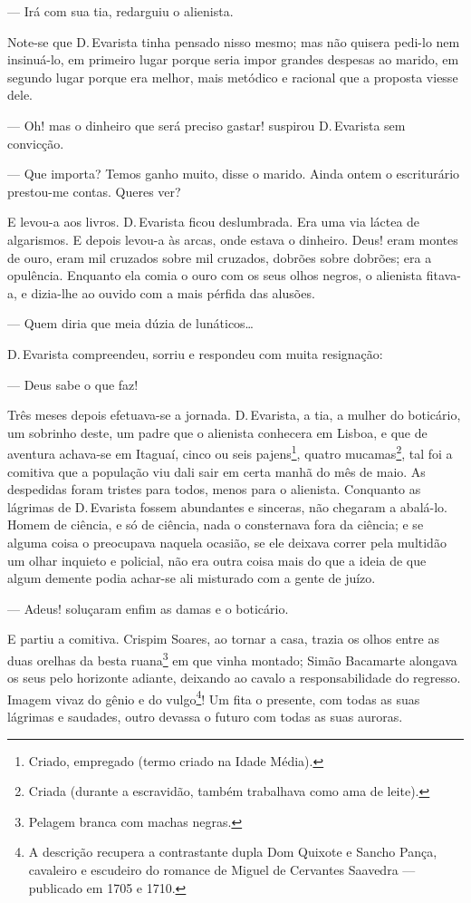 --- Irá com sua tia, redarguiu o alienista.

Note-se que D.\,Evarista tinha pensado nisso mesmo; mas não quisera
pedi-lo nem insinuá-lo, em primeiro lugar porque seria impor grandes
despesas ao marido, em segundo lugar porque era melhor, mais metódico e
racional que a proposta viesse dele.

--- Oh! mas o dinheiro que será preciso gastar! suspirou D.\,Evarista sem
convicção.

--- Que importa? Temos ganho muito, disse o marido. Ainda ontem o
escriturário prestou-me contas. Queres ver?

E levou-a aos livros. D.\,Evarista ficou deslumbrada. Era uma via láctea
de algarismos. E depois levou-a às arcas, onde estava o dinheiro. Deus!
eram montes de ouro, eram mil cruzados sobre mil cruzados, dobrões sobre
dobrões; era a opulência. Enquanto ela comia o ouro com os seus olhos
negros, o alienista fitava-a, e dizia-lhe ao ouvido com a mais pérfida
das alusões.

--- Quem diria que meia dúzia de lunáticos\ldots{}

D.\,Evarista compreendeu, sorriu e respondeu com muita resignação:

--- Deus sabe o que faz!

Três meses depois efetuava-se a jornada. D.\,Evarista, a tia, a mulher do
boticário, um sobrinho deste, um padre que o alienista conhecera em
Lisboa, e que de aventura achava-se em Itaguaí, cinco ou seis
pajens\footnote{Criado, empregado (termo criado na Idade Média).},
quatro mucamas\footnote{Criada (durante a escravidão, também trabalhava
  como ama de leite).}, tal foi a comitiva que a população viu dali sair
em certa manhã do mês de maio. As despedidas foram tristes para todos,
menos para o alienista. Conquanto as lágrimas de D.\,Evarista fossem
abundantes e sinceras, não chegaram a abalá-lo. Homem de ciência, e só
de ciência, nada o consternava fora da ciência; e se alguma coisa o
preocupava naquela ocasião, se ele deixava correr pela multidão um olhar
inquieto e policial, não era outra coisa mais do que a ideia de que
algum demente podia achar-se ali misturado com a gente de juízo.

--- Adeus! soluçaram enfim as damas e o boticário.

E partiu a comitiva. Crispim Soares, ao tornar a casa, trazia os olhos
entre as duas orelhas da besta ruana\footnote{Pelagem branca com machas
  negras.} em que vinha montado; Simão Bacamarte alongava os seus pelo
horizonte adiante, deixando ao cavalo a responsabilidade do regresso.
Imagem vivaz do gênio e do vulgo\footnote{A descrição recupera a
  contrastante dupla Dom Quixote e Sancho Pança, cavaleiro e escudeiro
  do romance de Miguel de Cervantes Saavedra --- publicado em 1705 e
  1710.}! Um fita o presente, com todas as suas lágrimas e saudades,
outro devassa o futuro com todas as suas auroras.

